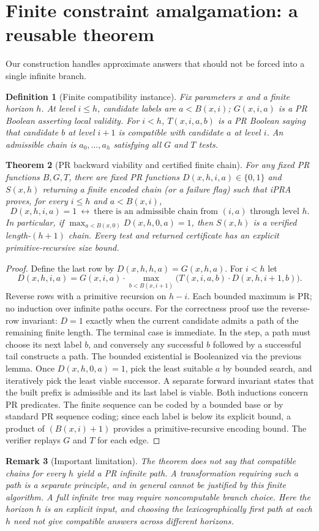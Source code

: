 \documentclass[11pt]{article}
\newtheorem{theorem}{Theorem}[section]\newtheorem{lemma}[theorem]{Lemma}\newtheorem{proposition}[theorem]{Proposition}\newtheorem{definition}[theorem]{Definition}\newtheorem{remark}[theorem]{Remark}
\begin{document}
\section{Finite constraint amalgamation: a reusable theorem}
Our construction handles approximate answers that should not be forced into a single infinite branch.
\begin{definition}[Finite compatibility instance]
Fix parameters $x$ and a finite horizon $h$. At level $i\le h$, candidate labels are $a<B(x,i)$; $G(x,i,a)$ is a PR Boolean asserting local validity. For $i<h$, $T(x,i,a,b)$ is a PR Boolean saying that candidate $b$ at level $i+1$ is compatible with candidate $a$ at level $i$. An admissible chain is $a_0,\dots,a_h$ satisfying all $G$ and $T$ tests.
\end{definition}
\begin{theorem}[PR backward viability and certified finite chain]
For any fixed PR functions $B,G,T$, there are fixed PR functions $D(x,h,i,a)\in\{0,1\}$ and $S(x,h)$ returning a finite encoded chain (or a failure flag) such that iPRA proves, for every $i\le h$ and $a<B(x,i)$,
\[D(x,h,i,a)=1\ \longleftrightarrow\ \text{there is an admissible chain from $(i,a)$ through level $h$}.\]
In particular, if $\max_{a<B(x,0)}D(x,h,0,a)=1$, then $S(x,h)$ is a verified length-$(h+1)$ chain. Every test and returned certificate has an explicit primitive-recursive size bound.
\end{theorem}
\begin{proof}
Define the last row by $D(x,h,h,a)=G(x,h,a)$. For $i<h$ let
\[D(x,h,i,a)=G(x,i,a)\cdot\max_{b<B(x,i+1)}\bigl(T(x,i,a,b)\cdot D(x,h,i+1,b)\bigr).\tag{1}\]
Reverse rows with a primitive recursion on $h-i$. Each bounded maximum is PR; no induction over infinite paths occurs. For the correctness proof use the reverse-row invariant: $D=1$ exactly when the current candidate admits a path of the remaining finite length. The terminal case is immediate. In the step, a path must choose its next label $b$, and conversely any successful $b$ followed by a successful tail constructs a path. The bounded existential is Booleanized via the previous lemma. Once $D(x,h,0,a)=1$, pick the least suitable $a$ by bounded search, and iteratively pick the least viable successor. A separate forward invariant states that the built prefix is admissible and its last label is viable. Both inductions concern PR predicates. The finite sequence can be coded by a bounded base or by standard PR sequence coding; since each label is below its explicit bound, a product of $(B(x,i)+1)$ provides a primitive-recursive encoding bound. The verifier replays $G$ and $T$ for each edge.
\end{proof}
\begin{remark}[Important limitation]
The theorem does not say that compatible chains for \emph{every} $h$ yield a PR infinite path. A transformation requiring such a path is a separate principle, and in general cannot be justified by this finite algorithm. A full infinite tree may require noncomputable branch choice. Here the horizon $h$ is an explicit input, and choosing the lexicographically first path at each $h$ need not give compatible answers across different horizons.
\end{remark}
\end{document}
